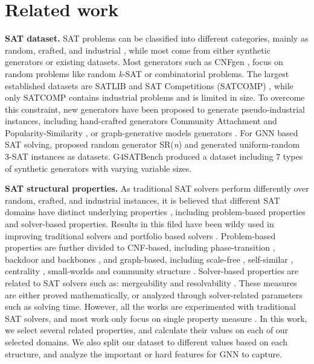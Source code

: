 \section{Related work}
\textbf{SAT dataset.}
SAT problems can be classified into different categories, mainly as random, crafted, and industrial \cite{alyahya2022structure}, while most come from either synthetic generators or existing datasets. Most generators such as CNFgen \cite{lauriaCNFgenGeneratorCrafted2017}, focus on random problems like random \textit{k}-SAT or combinatorial problems. The largest established datasets are SATLIB \cite{hoosSATLIBOnlineResource} and SAT Competitions (SATCOMP) \cite{InternationalSATCompetition}, while only SATCOMP contains industrial problems and is limited in size. To overcome this constraint, new generators have been proposed to generate pseudo-industrial instances, including hand-crafted generators Community Attachment \cite{giraldez-cruModularityBasedRandomSAT2015} and Popularity-Similarity  \cite{giraldez-cruLocalityRandomSAT2017}, or graph-generative models generators \cite{youG2SATLearningGenerate2019,li2024distribution,li2023hardsatgen,chen2023matching,garzon2022performance}. For GNN based SAT solving, \cite{selsam2018learning} proposed random generator SR(\textit{n}) and \cite{cameronPredictingPropositionalSatisfiability2020} generated uniform-random 3-SAT instances as datasets. G4SATBench \cite{liG4SATBenchBenchmarkingAdvancing2023a} produced a dataset including 7 types of synthetic generators with varying variable sizes.


\textbf{SAT structural properties.}
As traditional SAT solvers perform differently over random, crafted, and industrial instances, it is believed that different SAT domains have distinct underlying properties \cite{alyahyaStructureBooleanSatisfiability2023}, including problem-based properties and solver-based properties. Results in this filed have been wildy used in improving traditional solvers \cite{audemard2009predicting} and portfolio based solvers \cite{sonobe2016cbpenelope2016}. 
Problem-based properties are further divided to CNF-based, including phase-transition \cite{cheeseman1991really}, backdoor \cite{kilby2005backbones} and  backbones \cite{kilby2005backbones}, and graph-based, including scale-free \cite{ansoteguiStructureIndustrialSAT2009}, self-similar \cite{ansoteguiFractalDimensionSAT2014}, centrality \cite{katsirelos2012eigenvector}, small-worlds \cite{walsh1999search} and community structure \cite{ansoteguiCommunityStructureIndustrial2019}. Solver-based properties are related to SAT solvers such as: mergeability and resolvability \cite{zulkoski2018effect}. These measures are either proved mathematically, or analyzed through solver-related parameters such as solving time. However, all the works are experimented with traditional SAT solvers, and most work only focus on single property measure \cite{li2021hierarchical, zulkoski2018effect}. In this work, we select several related properties, and calculate their values on each of our selected domains. We also split our dataset to different values based on each structure, %
and analyze the important or hard features for GNN to capture. %



